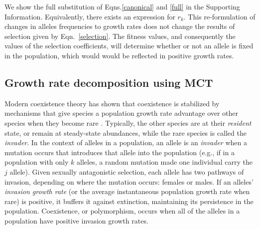 

We show the full substitution of Eqns.\ref{canonical} and \ref{full} in the Supporting Information. Equivalently, there exists an expression for $r_{k}$. This re-formulation of changes in alleles frequencies to growth rates does not change the results of selection given by Eqn.~\ref{selection}. The fitness values, and consequently the values of the selection coefficients, will determine whether or not an allele is fixed in the population, which would would be reflected in positive growth rates.

\subsection*{Growth rate decomposition using MCT}

Modern coexistence theory has shown that coexistence is stabilized by mechanisms that give species a population growth rate advantage over other species when they become rare \citep{chesson_stabilizing_1982, chesson2003quantifying, barabas_chessons_2018}. Typically, the other species are at their \textit{resident} state, or remain at steady-state abundances, while the rare species is called the \textit{invader}. In the context of alleles in a population, an allele is an \textit{invader} when a mutation occurs that introduces that allele into the population (e.g., if in a population with only $k$ alleles, a random mutation made one individual carry the $j$ allele). Given sexually antagonistic selection, each allele has two pathways of invasion, depending on where the mutation occurs: females or males. If an alleles' \textit{invasion growth rate} (or the average instantaneous population growth rate when rare) is positive, it buffers it against extinction, maintaining its persistence in the population.  Coexistence, or polymorphism, occurs when all of the alleles in a population have positive invasion growth rates.

